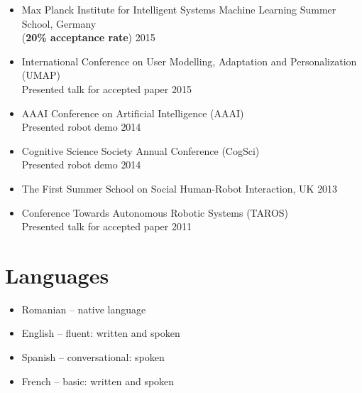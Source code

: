 \documentclass[10pt,letterpaper]{article}
\newcommand{\thing}[2]{{#1} \hfill {#2}}
\begin{document}
\begin{itemize}
\item \thing{Max Planck Institute for Intelligent Systems Machine Learning Summer School, Germany\\({\bf 20\% acceptance rate})}{2015}
\item \thing{International Conference on User Modelling, Adaptation and Personalization (UMAP)\\Presented talk for accepted paper}{2015}
\item \thing{AAAI Conference on Artificial Intelligence (AAAI)\\Presented robot demo}{2014}
\item \thing{Cognitive Science Society Annual Conference (CogSci)\\Presented robot demo}{2014}
\item \thing{The First Summer School on Social Human-Robot Interaction, UK}{2013}
\item \thing{Conference Towards Autonomous Robotic Systems (TAROS)\\Presented talk for accepted paper}{2011}
\end{itemize}

\section{Languages}
\begin{itemize}%
\item Romanian -- native language
\item English -- fluent: written and spoken
\item Spanish -- conversational: spoken
\item French -- basic: written and spoken
\end{itemize}
\end{document}
